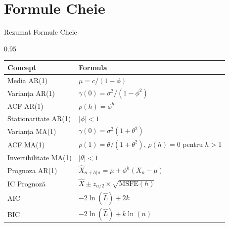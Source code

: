 \documentclass[9pt, aspectratio=169, t]{beamer}
\begin{document}
\section{Formule Cheie}

\begin{frame}{Rezumat Formule Cheie}
    \begin{cminipage}{0.95\textwidth}
    \small
    \begin{center}
    \begin{tabular}{ll}
        \toprule
        \textbf{Concept} & \textbf{Formula} \\
        \midrule
        Media AR(1) & $\mu = c/(1-\phi)$ \\[0.1cm]
        Varianța AR(1) & $\gamma(0) = \sigma^2/(1-\phi^2)$ \\[0.1cm]
        ACF AR(1) & $\rho(h) = \phi^h$ \\[0.1cm]
        Staționaritate AR(1) & $|\phi| < 1$ \\[0.1cm]
        \midrule
        Varianța MA(1) & $\gamma(0) = \sigma^2(1+\theta^2)$ \\[0.1cm]
        ACF MA(1) & $\rho(1) = \theta/(1+\theta^2)$, $\rho(h) = 0$ pentru $h > 1$ \\[0.1cm]
        Invertibilitate MA(1) & $|\theta| < 1$ \\[0.1cm]
        \midrule
        Prognoza AR(1) & $\hat{X}_{n+h|n} = \mu + \phi^h(X_n - \mu)$ \\[0.1cm]
        IC Prognoză & $\hat{X} \pm z_{\alpha/2} \times \sqrt{\text{MSFE}(h)}$ \\[0.1cm]
        \midrule
        AIC & $-2\ln(\hat{L}) + 2k$ \\[0.1cm]
        BIC & $-2\ln(\hat{L}) + k\ln(n)$ \\
        \bottomrule
    \end{tabular}
    \end{center}
    \end{cminipage}
\end{frame}
\end{document}
